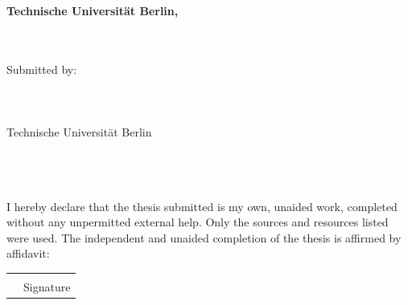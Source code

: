 {\vfill

\textbf{Technische Universit\"at Berlin, \projectYear} \\
\small{\facultyName \\
    \departmentName}
\vspace{1cm}
}

\thispagestyle{empty}
\clearpage

\vspace*{\fill}
\begin{centering}
    {\huge\textbf{\projectTitle}\par}
    \vspace{1cm}
    \large{\thesisType}\\
    \vspace{1cm}
    Submitted by:\\
    \authors\\
    \matrikel                     \\
    \authorEmail                  \\
    \vspace{1cm}
    Technische Universit\"at Berlin\\
    \facultyName \\
    \departmentName \\
    \vspace{1cm}
    \projectYear\\

\end{centering}

\vspace*{\fill}
\thispagestyle{empty}
\clearpage

\vspace*{\fill}
\noindent
I hereby declare that the thesis submitted is my own, unaided work, completed without any unpermitted external help. Only the sources and resources listed were used.
The independent and unaided completion of the thesis is affirmed by affidavit:
\vskip 2cm
\begin{tabular}{@{}p{.5in}p{4in}@{}}
     & \hrulefill \\
     & Signature  \\
\end{tabular}

\vspace*{\fill}
\thispagestyle{empty}
\clearpage